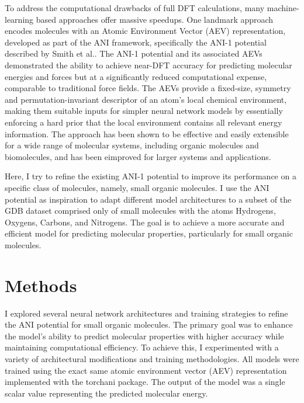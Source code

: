 \documentclass[11pt, twocolumn]{article}
\begin{document}
To address the computational drawbacks of full DFT calculations, many machine-learning based approaches offer massive speedups. One landmark approach encodes molecules with an Atomic Environment Vector (AEV) representation, developed as part of the ANI framework, specifically the ANI-1 potential described by Smith et al.. \cite{smith2017ani} The ANI-1 potential and its associated AEVs demonstrated the ability to achieve near-DFT accuracy for predicting molecular energies and forces but at a significantly reduced computational expense, comparable to traditional force fields. The AEVs provide a fixed-size, symmetry and permutation-invariant descriptor of an atom's local chemical environment, making them suitable inputs for simpler neural network models by essentially enforcing a hard prior that the local environment contains all relevant energy information. The approach has been shown to be effective and easily extensible for a wide range of molecular systems, including organic molecules and biomolecules, and has been eimproved for larger systems and applications. \cite{devereux2020extending}

Here, I try to refine the existing ANI-1 potential to improve its performance on a specific class of molecules, namely, small organic molecules. I use the ANI potential as inspiration to adapt different model architectures to a subset of the GDB dataset \cite{ruddigkeit2012enumeration} comprised only of small molecules with the atoms Hydrogens, Oxygens, Carbons, and Nitrogens. The goal is to achieve a more accurate and efficient model for predicting molecular properties, particularly for small organic molecules.

\section{Methods}

I explored several neural network architectures and training strategies to refine the ANI potential for small organic molecules. The primary goal was to enhance the model's ability to predict molecular properties with higher accuracy while maintaining computational efficiency. To achieve this, I experimented with a variety of architectural modifications and training methodologies. All models were trained using the exact same atomic environment vector (AEV) representation implemented with the torchani package. \cite{gao2020torchani} The output of the model was a single scalar value representing the predicted molecular energy.
\end{document}
